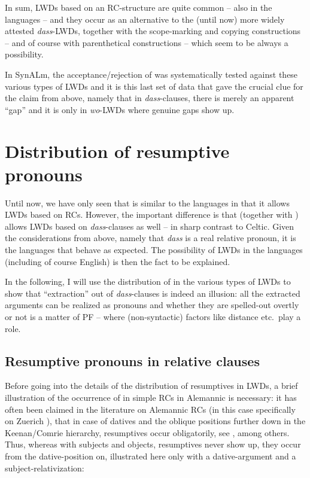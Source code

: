 \documentclass[output=paper]{langsci/langscibook}
\begin{document}
In sum, \glspl{LWD} based on an RC-structure are quite common -- also in the 
languages -- and they occur as an alternative to the (until now) more widely
attested \emph{dass}-\glspl{LWD}, together with the scope-marking and copying
constructions – and of course with parenthetical constructions – which seem to
be always a possibility.

In SynALm, the acceptance/rejection of  was systematically
tested against these various types of \glspl{LWD} and it is this last set of data that
gave the crucial clue for the claim from above, namely that in
\emph{dass}-clauses, there is merely an apparent \enquote{gap} and it is only in
\emph{wo}-\glspl{LWD} where genuine gaps show up.

\section{Distribution of resumptive pronouns} %

Until now, we have only seen that  is similar to the  languages
in that it allows \glspl{LWD} based on \glspl{RC}. However, the important
difference is that  (together with ) allows \glspl{LWD} based
on \emph{dass}-clauses as well – in sharp contrast to Celtic.  Given the
considerations from above, namely that \emph{dass} is a real relative pronoun,
it is the  languages that behave as expected. The possibility of
\glspl{LWD} in the  languages (including of course English) is then the
fact to be explained.

In the following, I will use the distribution of  in the
various types of \glspl{LWD} to show that \enquote{extraction} out of \emph{dass}-clauses is
indeed an illusion: all the extracted arguments can be realized as pronouns and
whether they are spelled-out overtly or not is a matter of \gls{PF} – where
(non-syntactic) factors like distance etc.\ play a role.

\subsection{Resumptive pronouns in  relative clauses} %

Before going into the details of the distribution of resumptives in \glspl{LWD}, a
brief illustration of the occurrence of  in simple \glspl{RC} in
Alemannic is necessary: it has often been claimed in the literature on
Alemannic \glspl{RC} (in this case specifically on Zuerich ), that in case of
datives and the oblique positions further down in the Keenan/Comrie hierarchy,
resumptives occur obligatorily, see \citet{vanRiemsdijk2003},
\citet{Salzmann2006} among others. Thus, whereas with subjects and objects,
resumptives never show up, they occur from the dative-position on, illustrated
here only with a dative-argument and a subject-relativization:
\end{document}
